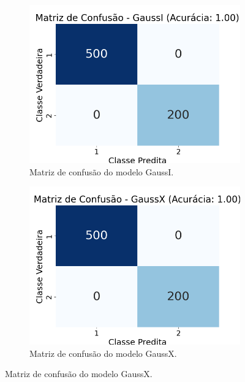 \begin{enumerate}
    \begin{figure}[H]
        \centering
        \begin{subfigure}[b]{0.3\textwidth}
            \centering
            \includegraphics[width=\textwidth]{fig/GaussI.png}
            \caption{Matriz de confusão do modelo GaussI.}
            \label{fig:confusion_matrix_gaussi}
        \end{subfigure}
        \hfill
        \begin{subfigure}[b]{0.3\textwidth}
            \centering
            \includegraphics[width=\textwidth]{fig/GaussX.png}
            \caption{Matriz de confusão do modelo GaussX.}
            \label{fig:confusion_matrix_gaussx}
        \end{subfigure}

\end{figure}
\end{enumerate}
